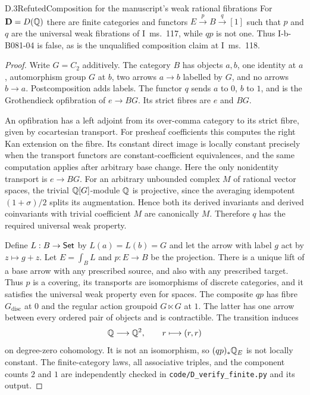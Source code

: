 \begin{claim}{D.3}{Refuted}{Composition for the manuscript's weak rational fibrations}
For $\mathbf D=D(\mathbb Q)$ there are finite categories and functors $E\xrightarrow{p}B\xrightarrow{q}[1]$ such that $p$ and $q$ are the universal weak fibrations of I~ms.~117, while $qp$ is not one. Thus I-b-B081-04 is false, as is the unqualified composition claim at I~ms.~118.
\end{claim}
\begin{proof}
Write $G=C_2$ additively. The category $B$ has objects $a,b$, one identity at $a$, automorphism group $G$ at $b$, two arrows $a\to b$ labelled by $G$, and no arrows $b\to a$. Postcomposition adds labels. The functor $q$ sends $a$ to $0$, $b$ to $1$, and is the Grothendieck opfibration of $e\to BG$. Its strict fibres are $e$ and $BG$.

An opfibration has a left adjoint from its over-comma category to its strict fibre, given by cocartesian transport. For presheaf coefficients this computes the right Kan extension on the fibre. Its constant direct image is locally constant precisely when the transport functors are constant-coefficient equivalences, and the same computation applies after arbitrary base change. Here the only nonidentity transport is $e\to BG$. For an arbitrary unbounded complex $M$ of rational vector spaces, the trivial $\mathbb Q[G]$-module $\mathbb Q$ is projective, since the averaging idempotent $(1+\sigma)/2$ splits its augmentation. Hence both its derived invariants and derived coinvariants with trivial coefficient $M$ are canonically $M$. Therefore $q$ has the required universal weak property.

Define $L:B\to\mathsf{Set}$ by $L(a)=L(b)=G$ and let the arrow with label $g$ act by $z\mapsto g+z$. Let $E=\int_BL$ and $p:E\to B$ be the projection. There is a unique lift of a base arrow with any prescribed source, and also with any prescribed target. Thus $p$ is a covering, its transports are isomorphisms of discrete categories, and it satisfies the universal weak property even for spaces. The composite $qp$ has fibre $G_{\mathrm{disc}}$ at $0$ and the regular action groupoid $G\ltimes G$ at $1$. The latter has one arrow between every ordered pair of objects and is contractible. The transition induces
\[
 \mathbb Q\longrightarrow\mathbb Q^2,\qquad r\longmapsto(r,r)
\]
on degree-zero cohomology. It is not an isomorphism, so $(qp)_*\mathbb Q_E$ is not locally constant. The finite-category laws, all associative triples, and the component counts $2$ and $1$ are independently checked in \texttt{code/D\_verify\_finite.py} and its output.
\end{proof}

